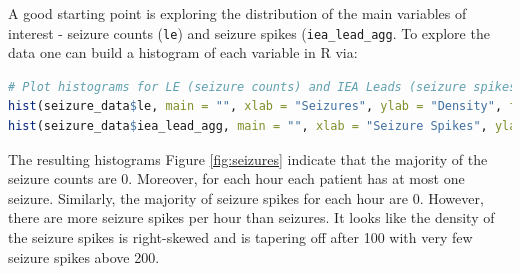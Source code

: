 A good starting point is exploring the distribution of the main variables of interest - seizure counts (\verb|le|) and seizure spikes (\verb|iea_lead_agg|. To explore the data one can build a histogram of each variable in R via:
\begin{lstlisting}[language=R]
# Plot histograms for LE (seizure counts) and IEA Leads (seizure spikes)
hist(seizure_data$le, main = "", xlab = "Seizures", ylab = "Density", freq=FALSE)
hist(seizure_data$iea_lead_agg, main = "", xlab = "Seizure Spikes", ylab = "Density", freq=FALSE)
\end{lstlisting}
The resulting histograms Figure \ref{fig:seizures} indicate that the majority of the seizure counts are 0. Moreover, for each hour each patient has at most one seizure. Similarly, the majority of seizure spikes for each hour are 0. However, there are more seizure spikes per hour than seizures. It looks like the density of the seizure spikes is right-skewed and is tapering off after 100 with very few seizure spikes above 200.
